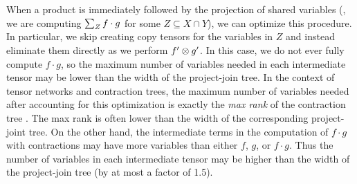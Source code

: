 When a product is immediately followed by the projection of shared variables (\ie, we are computing $\sum_Z f \cdot g$ for some $Z \subseteq X \cap Y$), we can optimize this procedure.
In particular, we skip creating copy tensors for the variables in $Z$ and instead eliminate them directly as we perform $f' \otimes g'$.
In this case, we do not ever fully compute $f \cdot g$, so the maximum number of variables needed in each intermediate tensor may be lower than the width of the project-join tree.
In the context of tensor networks and contraction trees, the maximum number of variables needed after accounting for this optimization is exactly the \emph{max rank} of the contraction tree \cite{KCMR18}.
The max rank is often lower than the width of the corresponding project-joint tree.
On the other hand, the intermediate terms in the computation of $f \cdot g$ with contractions may have more variables than either $f$, $g$, or $f \cdot g$.
Thus the number of variables in each intermediate tensor may be higher than the width of the project-join tree (by at most a factor of 1.5).
